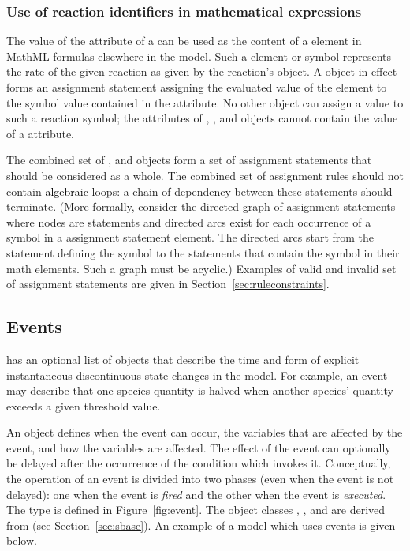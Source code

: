 \subsubsection{Use of reaction identifiers in mathematical expressions}
\label{subsec:reaction-as-symbol}

The value of the  attribute of a \Reaction can be
used as the content of a  element in MathML formulas
elsewhere in the model. Such a  element or symbol
represents the rate of the given reaction as given by the
reaction's \KineticLaw object. 
A \KineticLaw object in effect forms an assignment statement
assigning the evaluated value of the  element to the
symbol value contained in the \Reaction {} attribute.  No
other object can assign a value to such a reaction symbol; \ie
the  attributes of \InitialAssignment, \RateRule,
\AssignmentRule and \EventAssignment objects cannot contain the
value of a \Reaction {} attribute.

The combined set of \InitialAssignment, \AssignmentRule and
\KineticLaw objects form a set of assignment statements that
should be considered as a whole.  The combined set of assignment
rules should not contain \textcolor{black}{algebraic} loops: a chain of dependency
between these statements should terminate.  (More formally,
consider the directed graph of assignment statements where nodes
are statements and directed arcs exist for each occurrence of a
symbol in a assignment statement  element. The directed
arcs start from the statement defining the symbol to the
statements that contain the symbol in their math elements. Such a
graph must be acyclic.)  Examples of valid and invalid set of
assignment statements are given in
Section~\ref{sec:ruleconstraints}.


\subsection{Events}
\label{sec:events}

\Model has an optional list of \Event objects that describe the
time and form of explicit instantaneous discontinuous state
changes in the model.  For example, an event may describe that one
species quantity is halved when another species' quantity exceeds a
given threshold value.

An \Event object defines when the event can occur, the variables
that are affected by the event, and how the variables are
affected.  The effect of the event can optionally be delayed after
the occurrence of the condition which invokes it.  Conceptually,
the operation of an event is divided into two phases (even when
the event is not delayed): one when the event is \emph{fired} and
the other when the event is \emph{executed}. The \Event type is
defined in Figure~\vref{fig:event}.  The object classes \Event,
\Trigger, \Delay and \EventAssignment are derived from \SBase{}
(see Section~\ref{sec:sbase}).  An example of a model which uses
events is given below.

